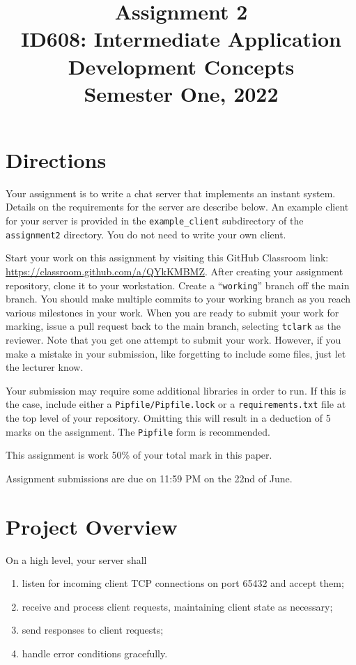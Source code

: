 \documentclass{article}
\begin{document}
\title{Assignment 2\\ID608: Intermediate Application Development Concepts \\Semester One, 2022}
\date{}
\maketitle

\section*{Directions}
Your assignment is to write a chat server that implements an instant system. Details on the requirements for the server are describe below. An example
client for your server is provided in the \texttt{example\_client} subdirectory of the \texttt{assignment2} directory. You do not need to write your own client.

Start your work on this assignment by visiting this GitHub Classroom link: \url{https://classroom.github.com/a/QYkKMBMZ}. After creating your assignment repository, clone it to your workstation.  Create a ``\texttt{working}'' branch off the main branch.  You should make multiple commits to your working branch as you reach various milestones in your work. When you are ready to submit your work for marking, issue a pull request back to the main branch, selecting \texttt{tclark} as the reviewer. Note that you get one attempt to submit your work. However, if you make a mistake in your submission, like forgetting to include some files, just let the lecturer know.


Your submission may require some additional libraries in order to run. If this is the case, include either a \texttt{Pipfile/Pipfile.lock} or a \texttt{requirements.txt} file at the top level of your repository. Omitting this will result in a deduction of 5 marks on the assignment. The \texttt{Pipfile} form is recommended.

This assignment is work 50\% of your total mark in this paper.


Assignment submissions are due on 11:59 PM on the 22nd of June.

\section{Project Overview}

On a high level, your server shall
    \begin{enumerate}
      \item listen for incoming client TCP connections on port 65432 and accept them;
      \item receive and process client requests, maintaining client state as necessary;
      \item send responses to client requests;
      \item handle error conditions gracefully.
    \end{enumerate}   
    
\end{document}
